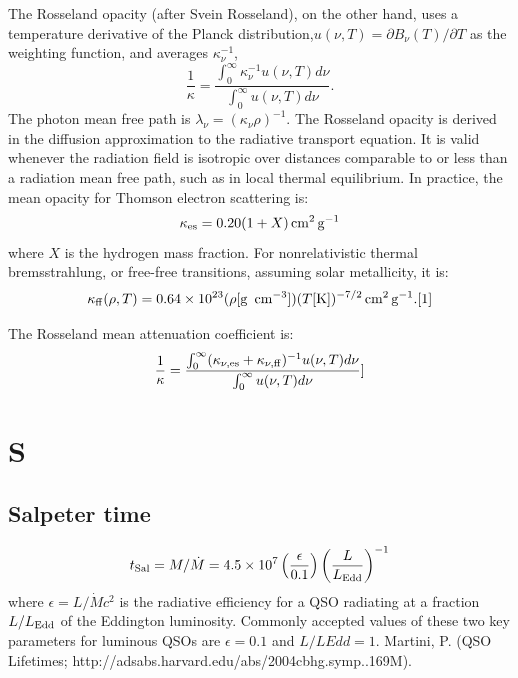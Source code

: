 \documentclass[11pt]{article}
\begin{document}
{\noindent
The Rosseland opacity (after Svein Rosseland), on the other hand, uses a
temperature derivative of the Planck distribution,$u(\nu ,T)=\partial
B_{\nu }(T)/\partial T$ as the weighting function, and averages $\kappa
_{\nu }^{-1}$,
\begin{equation}
\frac  {1}{\kappa} =\frac  {\int _{0}^{{\infty }}\kappa _{{\nu }}^{{-1}}u(\nu ,T)d\nu }{\int _{0}^{{\infty }}u(\nu ,T)d\nu}.
\end{equation}
\noindent
The photon mean free path is $\lambda _{\nu }=(\kappa _{\nu }\rho
)^{-1}$. The Rosseland opacity is derived in the diffusion
approximation to the radiative transport equation. It is valid
whenever the radiation field is isotropic over distances comparable to
or less than a radiation mean free path, such as in local thermal
equilibrium. In practice, the mean opacity for Thomson electron
scattering is:
\begin{equation}
\kappa _{{{\rm {es}}}}=0.20(1+X){{\rm {\,cm}}}^{2}{{\rm {\,g}}}^{{-1}}
\end{equation}
\noindent
where $X$ is the hydrogen mass fraction. For nonrelativistic thermal
bremsstrahlung, or free-free transitions, assuming solar metallicity,
it is:
\begin{equation}
\kappa _{{{\rm {ff}}}}(\rho ,T)=0.64\times 10^{{23}}(\rho [{{\rm {g}}}~{{\rm {\,cm}}}^{{-3}}])(T[{{\rm {K}}}])^{{-7/2}}{{\rm {\,cm}}}^{2}{{\rm {\,g}}}^{{-1}}.[1]
\end{equation}

\noindent
The Rosseland mean attenuation coefficient is:
\begin{equation}
{\frac  {1}{\kappa }}={\frac  {\int _{0}^{{\infty }}(\kappa _{{\nu ,{{\rm {es}}}}}+\kappa _{{\nu ,{{\rm {ff}}}}})^{{-1}}u(\nu ,T)d\nu }{\int _{0}^{{\infty }}u(\nu ,T)d\nu }}]
\end{equation}





\section*{S}
\subsection*{Salpeter time}
\begin{equation}
  t_{\rm Sal} = M/\dot{M} = 4.5 \times10^{7} \left( \frac{\epsilon}{0.1}\right ) \left( \frac{L}{L_{\rm Edd}}\right )^{-1}
\end{equation}
where $\epsilon = L/\dot{M} c^{2}$ is the radiative efficiency for a
QSO radiating at a fraction $L/L_{\rm Edd}$ of the Eddington
luminosity. Commonly accepted values of these two key parameters for
luminous QSOs are $\epsilon= 0.1$ and $L/LEdd = 1$.  Martini, P. (QSO
Lifetimes; http://adsabs.harvard.edu/abs/2004cbhg.symp..169M).

}
\end{document}
